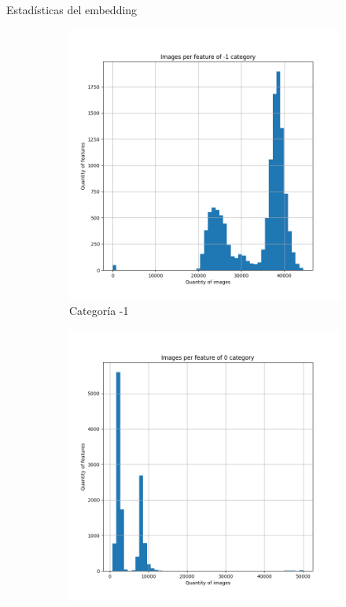 \documentclass{beamer}
\begin{document}
\begin{frame}{Estadísticas del embedding}

\begin{figure}[ht] 
	\centering
	\begin{subfigure}[b]{0.32\textwidth}
		\includegraphics[width=\textwidth] {Images/plots/25/Images_per_feature_of_-1_category.png}
		\caption{Categoría -1}
	\end{subfigure}
	\begin{subfigure}[b]{0.32\textwidth}
		\includegraphics[width=\textwidth]  {Images/plots/25/Images_per_feature_of_0_category.png}

\end{subfigure}
\end{figure}
\end{frame}
\end{document}
